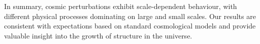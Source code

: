 In summary, cosmic perturbations exhibit scale-dependent behaviour, with different physical processes dominating on large and small scales. Our results are consistent with expectations based on standard cosmological models and provide valuable insight into the growth of structure in the universe.


